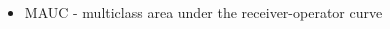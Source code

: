 \documentclass[8pt,xcolor=table,aspectratio=169]{beamer}
\begin{document}
\begin{frame}
\begin{columns}[t]
\begin{column}[t]{0.4\textwidth}
\begin{figure}
\begin{table}
\begin{tabular}{l|c|c}
\end{tabular}
\end{table}
   
\end{figure}
\begin{itemize}
 \item MAUC - multiclass area under the receiver-operator curve
\end{itemize}

\end{column}
\end{columns}







\end{frame}
\end{document}
